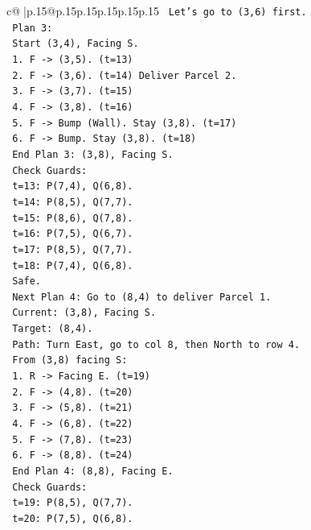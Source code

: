 \documentclass{article}
\begin{document}
{\begin{supertabular}{c@{$\;$}|p{.15\linewidth}@{}p{.15\linewidth}p{.15\linewidth}p{.15\linewidth}p{.15\linewidth}p{.15\linewidth}}
{{{\texttt{   Let's go to (3,6) first.} \\
\texttt{   Plan 3:} \\
\texttt{   Start (3,4), Facing S.} \\
\texttt{   1. F {-}> (3,5). (t=13)} \\
\texttt{   2. F {-}> (3,6). (t=14) Deliver Parcel 2.} \\
\texttt{   3. F {-}> (3,7). (t=15)} \\
\texttt{   4. F {-}> (3,8). (t=16)} \\
\texttt{   5. F {-}> Bump (Wall). Stay (3,8). (t=17)} \\
\texttt{   6. F {-}> Bump. Stay (3,8). (t=18)} \\
\texttt{   End Plan 3: (3,8), Facing S.} \\
\texttt{   Check Guards:} \\
\texttt{   t=13: P(7,4), Q(6,8).} \\
\texttt{   t=14: P(8,5), Q(7,7).} \\
\texttt{   t=15: P(8,6), Q(7,8).} \\
\texttt{   t=16: P(7,5), Q(6,7).} \\
\texttt{   t=17: P(8,5), Q(7,7).} \\
\texttt{   t=18: P(7,4), Q(6,8).} \\
\texttt{   Safe.} \\
\texttt{   Next Plan 4: Go to (8,4) to deliver Parcel 1.} \\
\texttt{   Current: (3,8), Facing S.} \\
\texttt{   Target: (8,4).} \\
\texttt{   Path: Turn East, go to col 8, then North to row 4.} \\
\texttt{   From (3,8) facing S:} \\
\texttt{   1. R {-}> Facing E. (t=19)} \\
\texttt{   2. F {-}> (4,8). (t=20)} \\
\texttt{   3. F {-}> (5,8). (t=21)} \\
\texttt{   4. F {-}> (6,8). (t=22)} \\
\texttt{   5. F {-}> (7,8). (t=23)} \\
\texttt{   6. F {-}> (8,8). (t=24)} \\
\texttt{   End Plan 4: (8,8), Facing E.} \\
\texttt{   Check Guards:} \\
\texttt{   t=19: P(8,5), Q(7,7).} \\
\texttt{   t=20: P(7,5), Q(6,8).} \\
}}}
\end{supertabular}}
\end{document}
